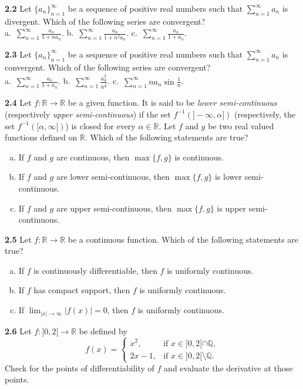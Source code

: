 \documentclass[11pt,a4paper]{article}
\newcommand{\Q}{\mathbb{Q}}
\newcommand{\R}{\mathbb{R}}
\newcommand{\qitem}[1]{\par\medskip\noindent\textbf{#1}\hspace{0.5em}}
\begin{document}
\qitem{2.2} Let $\{a_n\}_{n=1}^{\infty}$ be a sequence of positive real numbers such that $\sum_{n=1}^{\infty} a_n$ is divergent. Which of the following series are convergent?\\
a.\ $\displaystyle\sum_{n=1}^{\infty} \frac{a_n}{1 + na_n}$. \qquad b.\ $\displaystyle\sum_{n=1}^{\infty} \frac{a_n}{1 + n^2 a_n}$. \qquad c.\ $\displaystyle\sum_{n=1}^{\infty} \frac{a_n}{1 + a_n}$.

\qitem{2.3} Let $\{a_n\}_{n=1}^{\infty}$ be a sequence of positive real numbers such that $\sum_{n=1}^{\infty} a_n$ is convergent. Which of the following series are convergent?\\
a.\ $\displaystyle\sum_{n=1}^{\infty} \frac{a_n}{1 + a_n}$. \qquad b.\ $\displaystyle\sum_{n=1}^{\infty} \frac{a_n^{\frac{1}{4}}}{n^{\frac{4}{5}}}$. \qquad c.\ $\displaystyle\sum_{n=1}^{\infty} na_n \sin\frac{1}{n}$.

\qitem{2.4} Let $f : \R \to \R$ be a given function. It is said to be \emph{lower semi-continuous} (respectively \emph{upper semi-continuous}) if the set $f^{-1}(]-\infty, \alpha])$ (respectively, the set $f^{-1}([\alpha, \infty[)$) is closed for every $\alpha \in \R$. Let $f$ and $g$ be two real valued functions defined on $\R$. Which of the following statements are true?
\begin{enumerate}[a.]
  \item If $f$ and $g$ are continuous, then $\max\{f, g\}$ is continuous.
  \item If $f$ and $g$ are lower semi-continuous, then $\max\{f, g\}$ is lower semi-continuous.
  \item If $f$ and $g$ are upper semi-continuous, then $\max\{f, g\}$ is upper semi-continuous.
\end{enumerate}

\qitem{2.5} Let $f : \R \to \R$ be a continuous function. Which of the following statements are true?
\begin{enumerate}[a.]
  \item If $f$ is continuously differentiable, then $f$ is uniformly continuous.
  \item If $f$ has compact support, then $f$ is uniformly continuous.
  \item If $\lim_{|x| \to \infty} |f(x)| = 0$, then $f$ is uniformly continuous.
\end{enumerate}

\qitem{2.6} Let $f : ]0, 2[ \to \R$ be defined by
\[
  f(x) = \begin{cases} x^2, & \text{if } x \in ]0, 2[ \cap \Q, \\ 2x - 1, & \text{if } x \in ]0, 2[ \setminus \Q. \end{cases}
\]
Check for the points of differentiability of $f$ and evaluate the derivative at those points.
\end{document}
